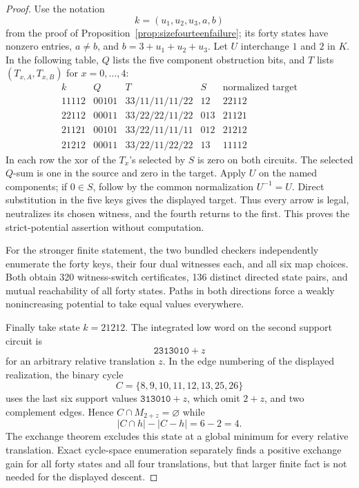 \documentclass[11pt]{article}
\theoremstyle{definition}
\theoremstyle{remark}
\begin{document}
\begin{proof}
Use the notation
\[
                    k=(u_1,u_2,u_3,a,b)
\]
from the proof of Proposition~\ref{prop:sizefourteenfailure}; its forty
states have nonzero entries, \(a\ne b\), and
\(b=3+u_1+u_2+u_3\).  Let \(U\) interchange \(1\) and \(2\) in \(K\).
In the following table, \(Q\) lists the five component obstruction bits,
and \(T\) lists
\((T_{x,A},T_{x,B})\) for \(x=0,\ldots,4\):
\[
\begin{array}{c|c|c|c|c}
k&Q&T&S&\text{normalized target}\\ \hline
11112&00101&33/11/11/11/22&12&22112\\
22112&00011&33/22/22/11/22&013&21121\\
21121&00101&33/22/11/11/11&012&21212\\
21212&00011&33/22/11/22/22&13&11112
\end{array}                                               \tag{15n}
\]
In each row the xor of the \(T_x\)'s selected by \(S\) is zero on both
circuits.  The selected \(Q\)-sum is one in the source and zero in the
target.  Apply \(U\) on the named components; if \(0\in S\), follow by
the common normalization \(U^{-1}=U\).  Direct substitution in the five
keys gives the displayed target.  Thus every arrow is legal, neutralizes
its chosen witness, and the fourth returns to the first.  This proves the
strict-potential assertion without computation.

For the stronger finite statement, the two bundled checkers independently
enumerate the forty keys, their four dual witnesses each, and all six map
choices.  Both obtain 320 witness-switch certificates, 136 distinct
directed state pairs, and mutual reachability of all forty states.  Paths
in both directions force a weakly nonincreasing potential to take equal
values everywhere.

Finally take state \(k=21212\).  The integrated low word on the second
support circuit is
\[
                              \texttt{2313010}+z
\]
for an arbitrary relative translation \(z\).  In the edge numbering of
the displayed realization, the binary cycle
\[
                         C=\{8,9,10,11,12,13,25,26\}     \tag{15o}
\]
uses the last six support values \(\texttt{313010}+z\), which omit
\(2+z\), and two complement edges.  Hence \(C\cap M_{2+z}=\varnothing\)
while
\[
                         |C\cap h|-|C-h|=6-2=4.
\]
The exchange theorem excludes this state at a global minimum for every
relative translation.  Exact cycle-space enumeration separately finds a
positive exchange gain for all forty states and all four translations,
but that larger finite fact is not needed for the displayed descent.
\end{proof}
\end{document}
